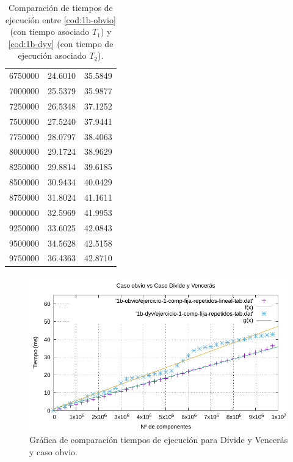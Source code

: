\begin{table}
\begin{tabular}{|r|r|r|}
		6750000 & 24.6010 & 35.5849 \\ 
		7000000 & 25.5379 & 35.9877 \\ 
		7250000 & 26.5348 & 37.1252 \\ 
		7500000 & 27.5240 & 37.9441 \\ 
		7750000 & 28.0797 & 38.4063 \\ 
		8000000 & 29.1724 & 38.9629 \\ 
		8250000 & 29.8814 & 39.6185 \\ 
		8500000 & 30.9434 & 40.0429 \\ 
		8750000 & 31.8024 & 41.1611 \\ 
		9000000 & 32.5969 & 41.9953 \\ 
		9250000 & 33.6025 & 42.0843 \\ 
		9500000 & 34.5628 & 42.5158 \\ 
		9750000 & 36.4363 & 42.8710 \\
        \hline 
	\end{tabular}

    \caption{Comparación de tiempos de ejecución entre \ref{cod:1b-obvio} 
    (con tiempo asociado $T_1$) y \ref{cod:1b-dyv} (con tiempo de
    ejecución asociado $T_2$).}
    \label{tab:1b-comp}
\end{table}

\begin{figure}
    \centering
    \includegraphics[scale=0.76]{img/e1b-comp.pdf}
    \caption{Gráfica de comparación tiempos de ejecución para Divide y Vencerás y caso obvio.}
    \label{fig:1b-comp}
\end{figure}